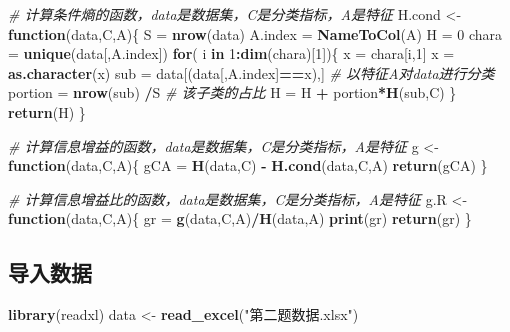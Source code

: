 \documentclass[
]{ctexart}
\newenvironment{Shaded}{\begin{snugshade}}{\end{snugshade}}
\newcommand{\CommentTok}[1]{\textcolor[rgb]{0.56,0.35,0.01}{\textit{#1}}}
\newcommand{\ControlFlowTok}[1]{\textcolor[rgb]{0.13,0.29,0.53}{\textbf{#1}}}
\newcommand{\DecValTok}[1]{\textcolor[rgb]{0.00,0.00,0.81}{#1}}
\newcommand{\FunctionTok}[1]{\textcolor[rgb]{0.13,0.29,0.53}{\textbf{#1}}}
\newcommand{\NormalTok}[1]{#1}
\newcommand{\OtherTok}[1]{\textcolor[rgb]{0.56,0.35,0.01}{#1}}
\newcommand{\SpecialCharTok}[1]{\textcolor[rgb]{0.81,0.36,0.00}{\textbf{#1}}}
\newcommand{\StringTok}[1]{\textcolor[rgb]{0.31,0.60,0.02}{#1}}
\begin{document}
\begin{Shaded}
\begin{Highlighting}[]
\CommentTok{\# 计算条件熵的函数，data是数据集，C是分类指标，A是特征}
\NormalTok{H.cond }\OtherTok{\textless{}{-}} \ControlFlowTok{function}\NormalTok{(data,C,A)\{}
\NormalTok{  S }\OtherTok{=} \FunctionTok{nrow}\NormalTok{(data)}
\NormalTok{  A.index }\OtherTok{=} \FunctionTok{NameToCol}\NormalTok{(A)}
\NormalTok{  H }\OtherTok{=} \DecValTok{0}
\NormalTok{  chara }\OtherTok{=} \FunctionTok{unique}\NormalTok{(data[,A.index])}
  \ControlFlowTok{for}\NormalTok{( i }\ControlFlowTok{in} \DecValTok{1}\SpecialCharTok{:}\FunctionTok{dim}\NormalTok{(chara)[}\DecValTok{1}\NormalTok{])\{}
\NormalTok{   x }\OtherTok{=}\NormalTok{ chara[i,}\DecValTok{1}\NormalTok{]}
\NormalTok{   x }\OtherTok{=} \FunctionTok{as.character}\NormalTok{(x)}
\NormalTok{   sub }\OtherTok{=}\NormalTok{ data[(data[,A.index]}\SpecialCharTok{==}\NormalTok{x),]  }\CommentTok{\# 以特征A对data进行分类}
\NormalTok{   portion }\OtherTok{=} \FunctionTok{nrow}\NormalTok{(sub) }\SpecialCharTok{/}\NormalTok{S  }\CommentTok{\# 该子类的占比}
\NormalTok{   H }\OtherTok{=}\NormalTok{ H }\SpecialCharTok{+}\NormalTok{ portion}\SpecialCharTok{*}\FunctionTok{H}\NormalTok{(sub,C) }
\NormalTok{  \}}
  \FunctionTok{return}\NormalTok{(H)}
\NormalTok{\}}

\CommentTok{\# 计算信息增益的函数，data是数据集，C是分类指标，A是特征}
\NormalTok{g }\OtherTok{\textless{}{-}} \ControlFlowTok{function}\NormalTok{(data,C,A)\{}
\NormalTok{  gCA }\OtherTok{=} \FunctionTok{H}\NormalTok{(data,C) }\SpecialCharTok{{-}} \FunctionTok{H.cond}\NormalTok{(data,C,A)}
  \FunctionTok{return}\NormalTok{(gCA)}
\NormalTok{\}}

\CommentTok{\# 计算信息增益比的函数，data是数据集，C是分类指标，A是特征}
\NormalTok{g.R }\OtherTok{\textless{}{-}} \ControlFlowTok{function}\NormalTok{(data,C,A)\{}
\NormalTok{  gr }\OtherTok{=} \FunctionTok{g}\NormalTok{(data,C,A)}\SpecialCharTok{/}\FunctionTok{H}\NormalTok{(data,A)}
  \FunctionTok{print}\NormalTok{(gr)}
  \FunctionTok{return}\NormalTok{(gr)}
\NormalTok{\}}
\end{Highlighting}
\end{Shaded}

\hypertarget{ux5bfcux5165ux6570ux636e}{%
\subsection{导入数据}\label{ux5bfcux5165ux6570ux636e}}

\begin{Shaded}
\begin{Highlighting}[]
\FunctionTok{library}\NormalTok{(readxl)}
\NormalTok{data }\OtherTok{\textless{}{-}} \FunctionTok{read\_excel}\NormalTok{(}\StringTok{"第二题数据.xlsx"}\NormalTok{)}
\end{Highlighting}
\end{Shaded}
\end{document}
